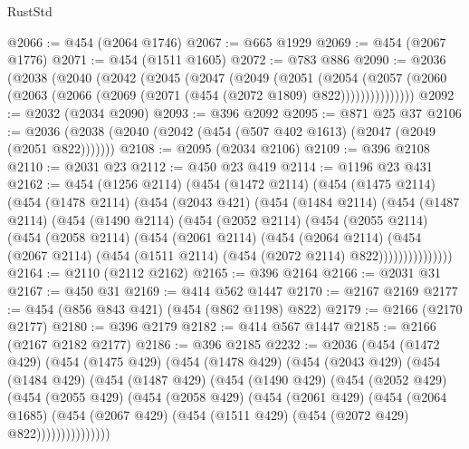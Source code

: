 \begin{lexlean}{RustStd}
\begin{coremodule}
{\begin{coremodule}
{{{{{{{{{{{{{{{{{{{{{{{{{{{{{{{{@2066 := @454 (@2064 @1746)
@2067 := @665 @1929
@2069 := @454 (@2067 @1776)
@2071 := @454 (@1511 @1605)
@2072 := @783 @886
@2090 := @2036
    (@2038
      (@2040
        (@2042
          (@2045
            (@2047
              (@2049
                (@2051
                  (@2054
                    (@2057
                      (@2060 (@2063 (@2066 (@2069 (@2071 (@454 (@2072 @1809) @822)))))))))))))))
@2092 := @2032 (@2034 @2090)
@2093 := @396 @2092
@2095 := @871 @25 @37
@2106 := @2036 (@2038 (@2040 (@2042 (@454 (@507 @402 @1613) (@2047 (@2049 (@2051 @822)))))))
@2108 := @2095 (@2034 @2106)
@2109 := @396 @2108
@2110 := @2031 @23
@2112 := @450 @23 @419
@2114 := @1196 @23 @431
@2162 := @454
    (@1256 @2114)
    (@454
      (@1472 @2114)
      (@454
        (@1475 @2114)
        (@454
          (@1478 @2114)
          (@454
            (@2043 @421)
            (@454
              (@1484 @2114)
              (@454
                (@1487 @2114)
                (@454
                  (@1490 @2114)
                  (@454
                    (@2052 @2114)
                    (@454
                      (@2055 @2114)
                      (@454
                        (@2058 @2114)
                        (@454
                          (@2061 @2114)
                          (@454
                            (@2064 @2114)
                            (@454
                              (@2067 @2114)
                              (@454 (@1511 @2114) (@454 (@2072 @2114) @822)))))))))))))))
@2164 := @2110 (@2112 @2162)
@2165 := @396 @2164
@2166 := @2031 @31
@2167 := @450 @31
@2169 := @414 @562 @1447
@2170 := @2167 @2169
@2177 := @454 (@856 @843 @421) (@454 (@862 @1198) @822)
@2179 := @2166 (@2170 @2177)
@2180 := @396 @2179
@2182 := @414 @567 @1447
@2185 := @2166 (@2167 @2182 @2177)
@2186 := @396 @2185
@2232 := @2036
    (@454
      (@1472 @429)
      (@454
        (@1475 @429)
        (@454
          (@1478 @429)
          (@454
            (@2043 @429)
            (@454
              (@1484 @429)
              (@454
                (@1487 @429)
                (@454
                  (@1490 @429)
                  (@454
                    (@2052 @429)
                    (@454
                      (@2055 @429)
                      (@454
                        (@2058 @429)
                        (@454
                          (@2061 @429)
                          (@454
                            (@2064 @1685)
                            (@454
                              (@2067 @429)
                              (@454 (@1511 @429) (@454 (@2072 @429) @822)))))))))))))))
}}}}}}}}}}}}}}}}}}}}}}}}}}}}}}}}
\end{coremodule}}
\end{coremodule}
\end{lexlean}
